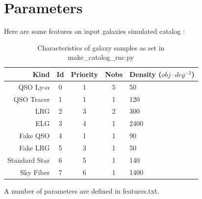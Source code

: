 \documentclass{article}
\def\psqd{$obj \cdot deg^{-2}$}
\begin{document}
\section{Parameters}
Here are some features on input galaxies simulated catalog :

\begin{table}[H]\centering
	\begin{tabular}{rcccl} \hline
		Kind&Id&Priority&Nobs&Density (\psqd)\\ \hline
		QSO Ly-$\alpha$ & 0 & 1 & 5 & 50\\
		QSO Tracer & 1 & 1 & 1 & 120\\
		LRG & 2 & 3 & 2 & 300\\
		ELG & 3 & 4 & 1 & 2400\\
		Fake QSO & 4 & 1 & 1 & 90\\
		Fake LRG & 5 & 3 & 1 & 50\\
		Standard Star & 6 & 5 & 1 & 140\\
		Sky Fiber & 7 & 6 & 1 & 1400\\ \hline
	\end{tabular}
	\caption{Characteristics of galaxy samples as set in make\_catalog\_rnc.py}\label{table:characteristics}
\end{table}
A number of parameters are defined in features.txt.
\end{document}
